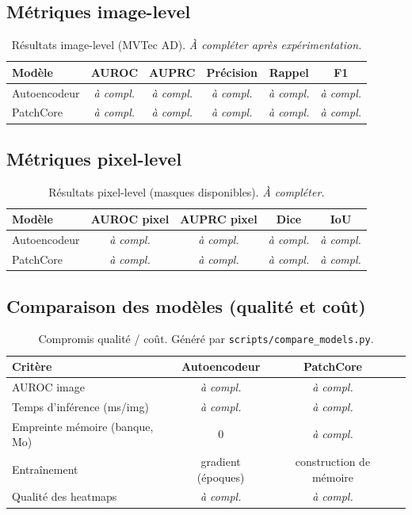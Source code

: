 \documentclass[11pt,a4paper]{article}
\begin{document}
\subsection{Métriques image-level}
\begin{table}[h]
\centering
\begin{tabular}{lccccc}
\toprule
Modèle & AUROC & AUPRC & Précision & Rappel & F1 \\
\midrule
Autoencodeur & \emph{à compl.} & \emph{à compl.} & \emph{à compl.} & \emph{à compl.} & \emph{à compl.} \\
PatchCore    & \emph{à compl.} & \emph{à compl.} & \emph{à compl.} & \emph{à compl.} & \emph{à compl.} \\
\bottomrule
\end{tabular}
\caption{Résultats image-level (MVTec AD). \emph{À compléter après expérimentation.}}
\end{table}

\subsection{Métriques pixel-level}
\begin{table}[h]
\centering
\begin{tabular}{lcccc}
\toprule
Modèle & AUROC pixel & AUPRC pixel & Dice & IoU \\
\midrule
Autoencodeur & \emph{à compl.} & \emph{à compl.} & \emph{à compl.} & \emph{à compl.} \\
PatchCore    & \emph{à compl.} & \emph{à compl.} & \emph{à compl.} & \emph{à compl.} \\
\bottomrule
\end{tabular}
\caption{Résultats pixel-level (masques disponibles). \emph{À compléter.}}
\end{table}

\subsection{Comparaison des modèles (qualité et coût)}
\begin{table}[h]
\centering
\begin{tabular}{lccc}
\toprule
Critère & Autoencodeur & PatchCore \\
\midrule
AUROC image & \emph{à compl.} & \emph{à compl.} \\
Temps d'inférence (ms/img) & \emph{à compl.} & \emph{à compl.} \\
Empreinte mémoire (banque, Mo) & 0 & \emph{à compl.} \\
Entraînement & gradient (époques) & construction de mémoire \\
Qualité des heatmaps & \emph{à compl.} & \emph{à compl.} \\
\bottomrule
\end{tabular}
\caption{Compromis qualité / coût. Généré par \texttt{scripts/compare\_models.py}.}
\end{table}
\end{document}
